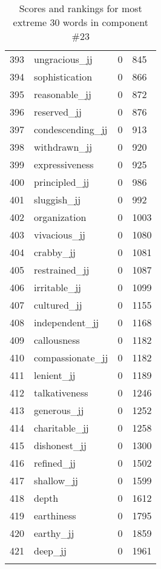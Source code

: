 \begin{longtable}[!htbp]{| rlr@{.}l |}
    393 & ungracious\_jj & 0 & 845 \\
    394 & sophistication & 0 & 866 \\
    395 & reasonable\_jj & 0 & 872 \\
    396 & reserved\_jj & 0 & 876 \\
    397 & condescending\_jj & 0 & 913 \\
    398 & withdrawn\_jj & 0 & 920 \\
    399 & expressiveness & 0 & 925 \\
    400 & principled\_jj & 0 & 986 \\
    401 & sluggish\_jj & 0 & 992 \\
    402 & organization & 0 & 1003 \\
    403 & vivacious\_jj & 0 & 1080 \\
    404 & crabby\_jj & 0 & 1081 \\
    405 & restrained\_jj & 0 & 1087 \\
    406 & irritable\_jj & 0 & 1099 \\
    407 & cultured\_jj & 0 & 1155 \\
    408 & independent\_jj & 0 & 1168 \\
    409 & callousness & 0 & 1182 \\
    410 & compassionate\_jj & 0 & 1182 \\
    411 & lenient\_jj & 0 & 1189 \\
    412 & talkativeness & 0 & 1246 \\
    413 & generous\_jj & 0 & 1252 \\
    414 & charitable\_jj & 0 & 1258 \\
    415 & dishonest\_jj & 0 & 1300 \\
    416 & refined\_jj & 0 & 1502 \\
    417 & shallow\_jj & 0 & 1599 \\
    418 & depth & 0 & 1612 \\
    419 & earthiness & 0 & 1795 \\
    420 & earthy\_jj & 0 & 1859 \\
    421 & deep\_jj & 0 & 1961 \\
    \hline
    \caption{Scores and rankings for most extreme 30 words in component \#23} \\
\end{longtable}

